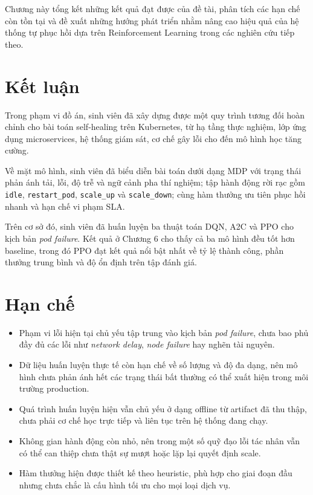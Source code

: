 Chương này tổng kết những kết quả đạt được của đề tài, phân tích các hạn chế còn tồn tại và đề xuất những hướng phát triển nhằm nâng cao hiệu quả của hệ thống tự phục hồi dựa trên Reinforcement Learning trong các nghiên cứu tiếp theo.

\section{Kết luận}
\noindent Trong phạm vi đồ án, sinh viên đã xây dựng được một quy trình tương đối 
hoàn chỉnh cho bài toán self-healing trên Kubernetes, từ hạ tầng thực nghiệm, 
lớp ứng dụng microservices, hệ thống giám sát, cơ chế gây lỗi cho đến mô hình 
học tăng cường.

\noindent Về mặt mô hình, sinh viên đã biểu diễn bài toán dưới dạng MDP với trạng 
thái phản ánh tải, lỗi, độ trễ và ngữ cảnh pha thí nghiệm; tập hành động rời rạc gồm 
\texttt{idle}, \texttt{restart\_pod}, \texttt{scale\_up} và \texttt{scale\_down}; 
cùng hàm thưởng ưu tiên phục hồi nhanh và hạn chế vi phạm SLA.

\noindent Trên cơ sở đó, sinh viên đã huấn luyện ba thuật toán DQN, A2C và PPO cho kịch bản 
\textit{pod failure}. Kết quả ở Chương 6 cho thấy cả ba mô hình đều tốt hơn baseline, 
trong đó PPO đạt kết quả nổi bật nhất về tỷ lệ thành công, phần thưởng trung bình và độ ổn 
định trên tập đánh giá.

\section{Hạn chế}
\begin{itemize}
    \item Phạm vi lỗi hiện tại chủ yếu tập trung vào kịch bản \textit{pod failure}, 
    chưa bao phủ đầy đủ các lỗi như \textit{network delay}, \textit{node failure} 
    hay nghẽn tài nguyên.
    \item Dữ liệu huấn luyện thực tế còn hạn chế về số lượng và độ đa dạng, nên mô hình 
    chưa phản ánh hết các trạng thái bất thường có thể xuất hiện trong môi trường production.
    \item Quá trình huấn luyện hiện vẫn chủ yếu ở dạng offline từ artifact đã thu thập, 
    chưa phải cơ chế học trực tiếp và liên tục trên hệ thống đang chạy.
    \item Không gian hành động còn nhỏ, nên trong một số quỹ đạo lỗi tác nhân vẫn có thể 
    can thiệp chưa thật sự mượt hoặc lặp lại quyết định scale.
    \item Hàm thưởng hiện được thiết kế theo heuristic, phù hợp cho giai đoạn đầu nhưng 
    chưa chắc là cấu hình tối ưu cho mọi loại dịch vụ.
\end{itemize}

